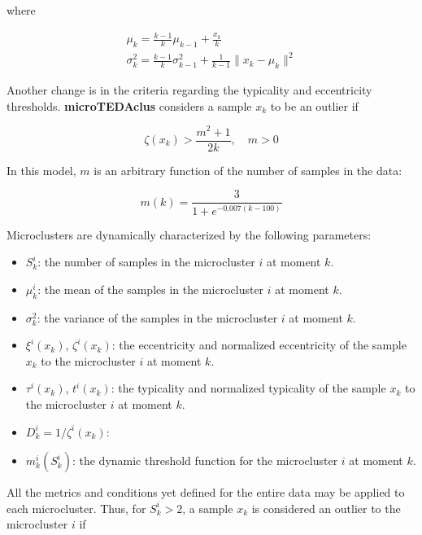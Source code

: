 \documentclass[a4paper]{article}
\begin{document}
where

\begin{gather}
    \mu_k = \frac{k - 1}{k} \mu_{k-1} + \frac{x_k}{k} \\
    \sigma^2_k = \frac{k - 1}{k} \sigma^2_{k-1} + \frac{1}{k - 1} \lVert x_k - \mu_k \rVert^2
\end{gather}

Another change is in the criteria regarding the typicality and eccentricity thresholds. \textbf{microTEDAclus} considers a sample $x_k$ to be an outlier if

\begin{equation}
    \zeta(x_k) > \frac{m^2 + 1}{2k}, \quad m > 0 \label{eq:angelovs_outlier}
\end{equation}

In this model, $m$ is an arbitrary function of the number of samples in the data:

\begin{equation}
    m(k) = \frac{3}{1 + e^{-0.007(k - 100)}}
\end{equation}

Microclusters are dynamically characterized by the following parameters:

\begin{itemize}
    \item $S^i_k$: the number of samples in the microcluster $i$ at moment $k$.
    \item $\mu^i_k$: the mean of the samples in the microcluster $i$ at moment $k$.
    \item $\sigma^2_k$: the variance of the samples in the microcluster $i$ at moment $k$.
    \item $\xi^i(x_k)$, $\zeta^i(x_k)$: the eccentricity and normalized eccentricity of the sample $x_k$ to the microcluster $i$ at moment $k$.
    \item $\tau^i(x_k)$, $t^i(x_k)$: the typicality and normalized typicality of the sample $x_k$ to the microcluster $i$ at moment $k$.
    \item $D^i_k = 1 / \zeta^i(x_k)$: 
    \item $m^i_k(S^i_k)$: the dynamic threshold function for the microcluster $i$ at moment $k$.
\end{itemize} \label{list:microcluster_parameters}

All the metrics and conditions yet defined for the entire data may be applied to each microcluster. Thus, for $S^i_k > 2$, a sample $x_k$ is considered an outlier to the microcluster $i$ if
\end{document}
